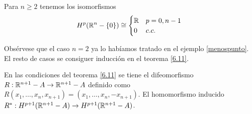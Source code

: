 \documentclass[CV.tex]{subfiles}
\begin{document}
\begin{coro}\label{6.13}
Para $n\geq 2$ tenemos los isomorfismos
\[
H^p(\mathbb{R}^n-\{0\})\cong \begin{cases}
\mathbb{R} & p=0,n-1\\
0 & c.c.
\end{cases}
\]
\end{coro}
Obsérvese que el caso $n=2$ ya lo habíamos tratado en el ejemplo \ref{menospunto}. El resto de casos se consiguer inducción en el teorema \ref{6.11}.

\begin{prop}\label{addendum}
En las condiciones del teorema \ref{6.11} se tiene el difeomorfismo $R:\mathbb{R}^{n+1}-A\to \mathbb{R}^{n+1}-A$ definido como $R(x_1,\dots, x_n,x_{n+1})=(x_1,\dots, x_n,-x_{n+1})$. El homomorfismo inducido $R^*:H^{p+1}(\mathbb{R}^{n+1}-A)\to H^{p+1}(\mathbb{R}^{n+1}-A)$. 
\end{prop}
\end{document}
